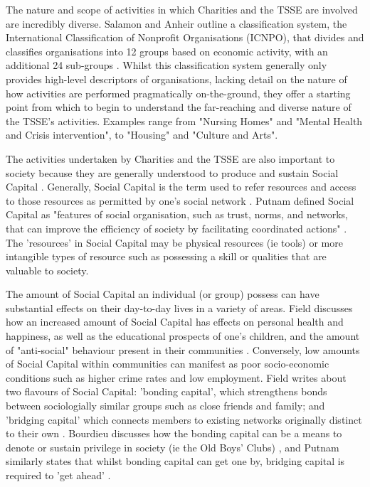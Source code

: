 The nature and scope of activities in which Charities and the TSSE are involved are incredibly diverse. Salamon and Anheir outline a classification system, the International Classification of Nonprofit Organisations (ICNPO), that divides and classifies organisations into 12 groups based on economic activity, with an additional 24 sub-groups \cite{salamon_search_1992}. Whilst this classification system generally only provides high-level descriptors of organisations, lacking detail on the nature of how activities are performed pragmatically on-the-ground, they offer a starting point from which to begin to understand the far-reaching and diverse nature of the TSSE's activities. Examples range from "Nursing Homes" and "Mental Health and Crisis intervention", to "Housing" and "Culture and Arts".

The activities undertaken by Charities and the TSSE are also important to society because they are generally understood to produce and sustain Social Capital \cite{king_social_2004, wang_social_2008, swanson_strategic_2013}. Generally, Social Capital is the term used to refer resources and access to those resources as permitted by one's social network \cite{field_social_2003}. Putnam defined Social Capital as "features of social organisation, such as trust, norms, and networks, that can improve the efficiency of society by facilitating coordinated actions" \cite{putnam_making_1994}. The 'resources' in Social Capital may be physical resources (ie tools) or more intangible types of resource such as possessing a skill or qualities that are valuable to society.

The amount of Social Capital an individual (or group) possess can have substantial effects on their day-to-day lives in a variety of areas. Field discusses how an increased amount of Social Capital has effects on personal health and happiness, as well as the educational prospects of one's children, and the amount of "anti-social" behaviour present in their communities \cite{field_social_2003}. Conversely, low amounts of Social Capital within communities can manifest as poor socio-economic conditions such as higher crime rates and low employment. Field writes about two flavours of Social Capital: 'bonding capital', which strengthens bonds between sociologially similar groups such as close friends and family; and 'bridging capital' which connects members to existing networks originally distinct to their own \cite{field_social_2003}. Bourdieu discusses how the bonding capital can be a means to denote or sustain privilege in society (ie the Old Boys' Clubs) \cite{nash_bourdieu_1990}, and Putnam similarly states that whilst bonding capital can get one by, bridging capital is required to 'get ahead' \cite{putnam_making_1994, woolcock_social_1998}.

